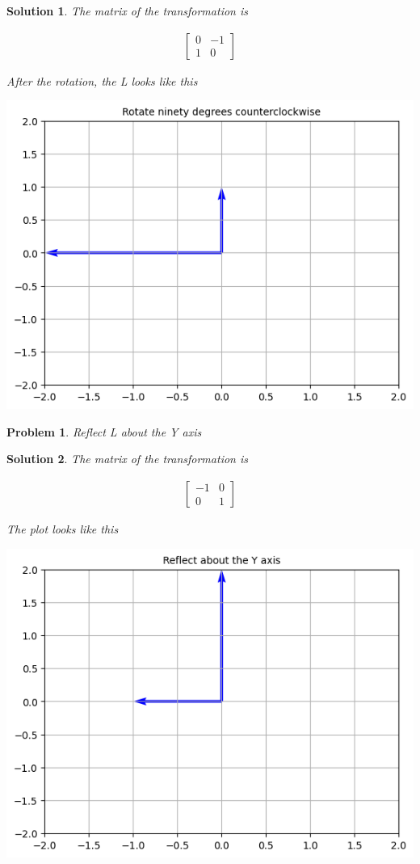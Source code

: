 \documentclass{article}
\newtheorem{problem}{Problem}
\newtheorem*{solution}{Solution}
\begin{document}
\begin{solution}
The matrix of the transformation is 

\begin{align*}
\begin{bmatrix}
0 & -1 \\ 
1 & 0
\end{bmatrix}
\end{align*}

After the rotation, the L looks like this

\includegraphics[scale=0.5, center]{Lrot90} 

\end{solution}

\begin{problem}
Reflect L about the Y axis
\end{problem}

\begin{solution}
The matrix of the transformation is

\begin{align*}
\begin{bmatrix}
-1 & 0 \\ 
0 & 1
\end{bmatrix}
\end{align*}

The plot looks like this

\includegraphics[scale=0.5, center]{Lreflecty} 

\end{solution}
\end{document}

